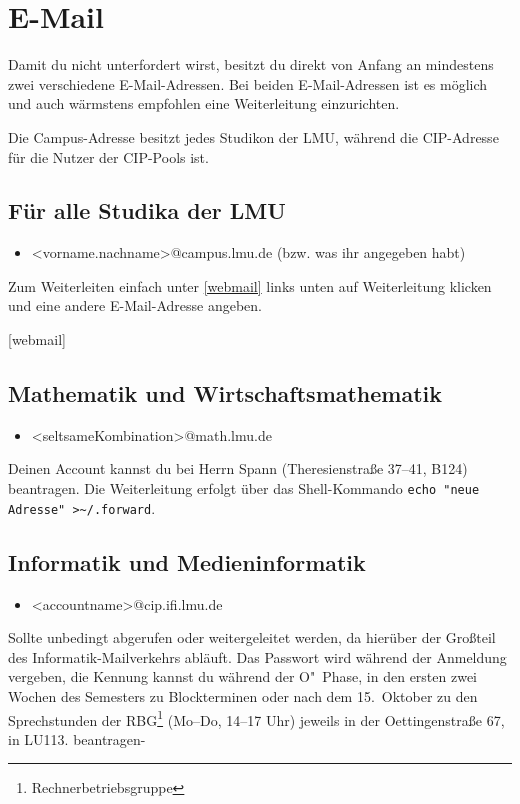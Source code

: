 \begin{urlList}
\end{urlList}


\section{E-Mail}
Damit du nicht unterfordert wirst, besitzt du direkt von Anfang an mindestens zwei verschiedene E-Mail-Adressen. Bei beiden E-Mail-Adressen ist es möglich und auch wärmstens empfohlen eine Weiterleitung einzurichten.

Die Campus-Adresse besitzt jedes Studikon der LMU, während die CIP-Adresse für die Nutzer der CIP-Pools ist.

\subsection*{Für alle Studika der LMU}
\begin{itemize}
	\item[]<vorname.nachname>@campus.lmu.de (bzw. was ihr angegeben habt)
\end{itemize}
Zum Weiterleiten einfach unter \ref{webmail} links unten auf Weiterleitung klicken und eine andere E-Mail-Adresse angeben.

\begin{urlList}
	[webmail]
\end{urlList}

\subsection*{Mathematik und Wirtschaftsmathematik\subjectList{\subjectM\subjectW}}
\begin{itemize}
	\item[]<seltsameKombination>@math.lmu.de
\end{itemize}
Deinen Account kannst du bei Herrn Spann (Theresienstraße 37--41, B124) beantragen. Die Weiterleitung erfolgt über das Shell-Kommando \verb|echo "neue Adresse" >~/.forward|. 

\subsection*{Informatik und Medieninformatik \subjectList{\subjectI\subjectMI}}
\begin{itemize}
	\item[]<accountname>@cip.ifi.lmu.de
\end{itemize}
Sollte unbedingt abgerufen oder weitergeleitet werden, da hierüber der Großteil des Informatik-Mailverkehrs abläuft. Das Passwort wird während der Anmeldung vergeben, die Kennung kannst du während der O"~Phase, in den ersten zwei Wochen des Semesters zu Blockterminen oder nach dem 15.\ Oktober zu den Sprechstunden der RBG\footnote{Rechnerbetriebsgruppe} 
(Mo--Do, 14--17 Uhr) jeweils in der Oettingenstraße 67, in LU113. beantragen-

